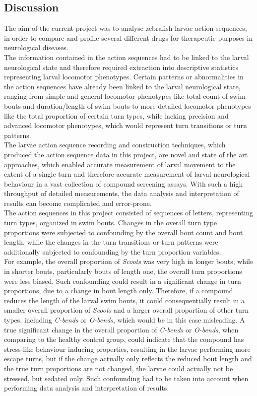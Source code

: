 \documentclass[a4paper,12pt]{article}
\begin{document}
\subsection{Discussion}
The aim of the current project was to analyse zebrafish larvae action sequences, in order to compare and profile several different drugs for therapeutic purposes in neurological diseases.\\The information contained in the action sequences had to be linked to the larval neurological state and therefore required extraction into descriptive statistics representing larval locomotor phenotypes. Certain patterns or abnormalities in the action sequences have already been linked to the larval neurological state, ranging from simple and general locomotor phenotypes like total count of swim bouts and duration/length of swim bouts to more detailed locomotor phenotypes like the total proportion of certain turn types, while lacking precision and advanced locomotor phenotypes, which would represent turn transitions or turn patterns.
\\The larvae action sequence recording and construction techniques, which produced the action sequence data in this project, are novel and state of the art approaches, which enabled accurate measurement of larval movement to the extent of a single turn and therefore accurate measurement of larval neurological behaviour in a vast collection of compound screening assays. With such a high throughput of detailed measurements, the data analysis and interpretation of results can become complicated and error-prone.
\\The action sequences in this project consisted of sequences of letters, representing turn types, organized in swim bouts. Changes in the overall turn type proportions were subjected to confounding by the overall bout count and bout length, while the changes in the turn transitions or turn patterns were additionally subjected to confounding by the turn proportion variables.\\For example, the overall proportion of \textit{Scoots} was very high in longer bouts, while in shorter bouts, particularly bouts of length one, the overall turn proportions were less biased. Such confounding could result in a significant change in turn proportions, due to a change in bout length only. Therefore, if a compound reduces the length of the larval swim bouts, it could consequentially result in a smaller overall proportion of \textit{Scoots} and a larger overall proportion of other turn types, including \textit{C-bends} or \textit{O-bends}, which would be in this case misleading. A true significant change in the overall proportion of \textit{C-bends} or \textit{O-bends}, when comparing to the healthy control group, could indicate that the compound has stress-like behaviour inducing properties, resulting in the larvae performing more escape turns, but if the change actually only reflects the reduced bout length and the true turn proportions are not changed, the larvae could actually not be stressed, but sedated only. Such confounding had to be taken into account when performing data analysis and interpretation of results. 
\end{document}
